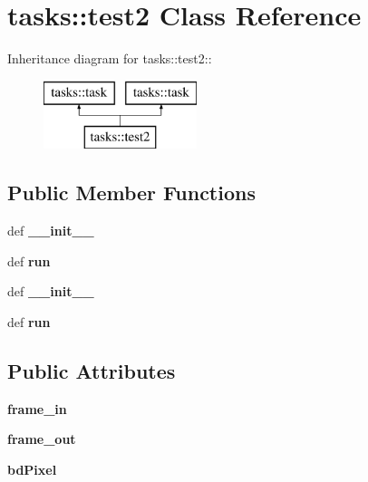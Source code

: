 \section{tasks::test2 Class Reference}
\label{classtasks_1_1test2}
Inheritance diagram for tasks::test2::\begin{figure}[H]
\begin{center}
\leavevmode
\includegraphics[height=2cm]{classtasks_1_1test2}
\end{center}
\end{figure}
\subsection*{Public Member Functions}
\begin{CompactItemize}
\item 
def \textbf{\_\-\_\-init\_\-\_\-}\label{classtasks_1_1test2_3471bd5d13ce9b406bbeaaf9ff95a276}

\item 
def \textbf{run}\label{classtasks_1_1test2_9c98ce5152399d4ff854b3da5c263354}

\item 
def \textbf{\_\-\_\-init\_\-\_\-}\label{classtasks_1_1test2_3471bd5d13ce9b406bbeaaf9ff95a276}

\item 
def \textbf{run}\label{classtasks_1_1test2_9c98ce5152399d4ff854b3da5c263354}

\end{CompactItemize}
\subsection*{Public Attributes}
\begin{CompactItemize}
\item 
\textbf{frame\_\-in}\label{classtasks_1_1test2_5f996eb068089f6bb0251020246959d8}

\item 
\textbf{frame\_\-out}\label{classtasks_1_1test2_cfdee3257fef1d67cf9c3c538abeb8ca}

\item 
\textbf{bd\-Pixel}\label{classtasks_1_1test2_16d25f922d1d5a3dc9ac52262cf2ccd1}

\end{CompactItemize}
